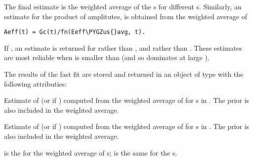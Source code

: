 \documentclass[letterpaper,10pt,english]{sphinxmanual}
\def\PYGZus{\char`\_}
\begin{document}
\begin{fulllineitems}
The final estimate is the weighted average  of the
s for different s. Similarly, an estimate for the
product of amplitutes,  is obtained from the weighted
average of

\begin{Verbatim}[commandchars=\\\{\}]
Aeff(t) = Gc(t)/fn(Eeff\PYGZus{}avg, t).
\end{Verbatim}

If , an estimate is returned for  rather
than , and  rather than . 
These estimates are most reliable when  is smaller than
 (and so dominates at large ).

The results of the fast fit are stored and returned in an object of type 
{\hyperref[corrfitter:corrfitter.fastfit]{}} with the following attributies:

\begin{fulllineitems}
\label{corrfitter:fastfit.E}
Estimate of  (or  if ) computed
from the weighted average of  for s in
. The prior is also included in the weighted average.

\end{fulllineitems}


\begin{fulllineitems}
\label{corrfitter:fastfit.ampl}
Estimate of  (or  if )
computed from the weighted average of  for s in
. The prior is also included in the weighted 
average.

\end{fulllineitems}


\begin{fulllineitems}
\label{corrfitter:fastfit.chi2}
 is the  for the weighted average of
s;  is the same for the s.

\end{fulllineitems}


\end{fulllineitems}
\end{document}
